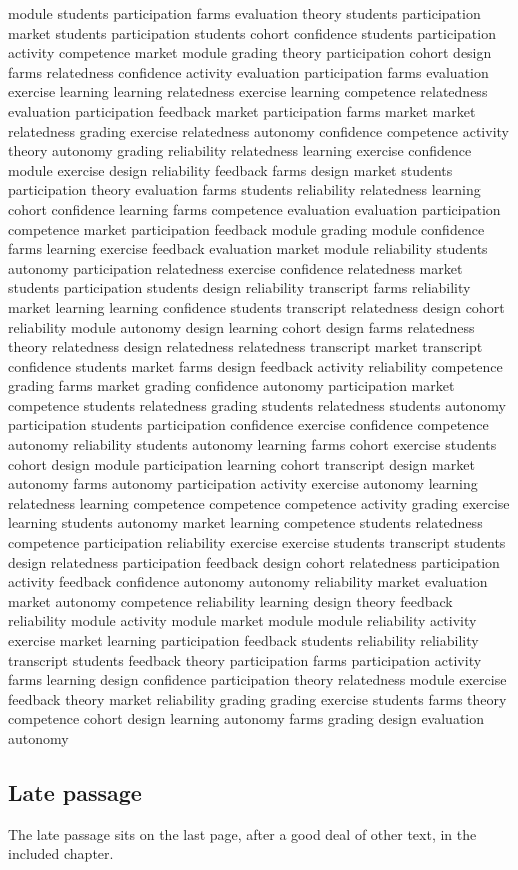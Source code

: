 module students participation farms evaluation theory students participation market students participation students cohort confidence
students participation activity competence market module grading theory participation cohort design farms relatedness confidence
activity evaluation participation farms evaluation exercise learning learning relatedness exercise learning competence relatedness evaluation
participation feedback market participation farms market market relatedness grading exercise relatedness autonomy confidence competence
activity theory autonomy grading reliability relatedness learning exercise confidence module exercise design reliability feedback
farms design market students participation theory evaluation farms students reliability relatedness learning cohort confidence
learning farms competence evaluation evaluation participation competence market participation feedback module grading module confidence
farms learning exercise feedback evaluation market module reliability students autonomy participation relatedness exercise confidence
relatedness market students participation students design reliability transcript farms reliability market learning learning confidence
students transcript relatedness design cohort reliability module autonomy design learning cohort design farms relatedness
theory relatedness design relatedness relatedness transcript market transcript confidence students market farms design feedback
activity reliability competence grading farms market grading confidence autonomy participation market competence students relatedness
grading students relatedness students autonomy participation students participation confidence exercise confidence competence autonomy reliability
students autonomy learning farms cohort exercise students cohort design module participation learning cohort transcript
design market autonomy farms autonomy participation activity exercise autonomy learning relatedness learning competence competence
competence activity grading exercise learning students autonomy market learning competence students relatedness competence participation
reliability exercise exercise students transcript students design relatedness participation feedback design cohort relatedness participation
activity feedback confidence autonomy autonomy reliability market evaluation market autonomy competence reliability learning design
theory feedback reliability module activity module market module module reliability activity exercise market learning
participation feedback students reliability reliability transcript students feedback theory participation farms participation activity farms
learning design confidence participation theory relatedness module exercise feedback theory market reliability grading grading
exercise students farms theory competence cohort design learning autonomy farms grading design evaluation autonomy

\subsection{Late passage}
The late passage sits on the last page, after a good deal of other text, in the included chapter.
